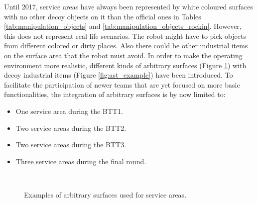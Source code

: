 Until 2017, service areas have always been represented by white coloured surfaces with no other decoy objects on it than the official ones in Tables \ref{tab:manipulation_objects} and \ref{tab:manipulation_objects_rockin}.
However, this does not represent real life scenarios.
The robot might have to pick objects from different colored or dirty places. Also there could be other industrial items on the surface area that the robot must avoid.
In order to make the operating environment more realistic, different kinds of arbitrary surfaces (Figure \ref{fig:ast_surface_example}) with decoy industrial items (Figure \ref{fig:ast_example}) have been introduced.
To facilitate the participation of newer teams that are yet focused on more basic functionalities, the integration of arbitrary surfaces is by now limited to:
\begin{itemize}
\item One service area during the BTT1.
\item Two service areas during the BTT2.
\item Two service areas during the BTT3.
\item Three service areas during the final round.
\end{itemize}

\begin{figure}[h!]
\centering
{}
\hspace{0.5cm}
\hspace{0.5cm}
\\
\hspace{0.5cm}
\caption{Examples of arbitrary surfaces used for service areas.}
\label{fig:ast_surface_example}
\end{figure}

